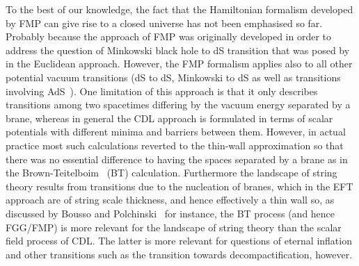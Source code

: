 \documentclass[a4paper,11pt]{article}
\numberwithin{equation}{section}
\begin{document}
To the best of our knowledge, the fact that the Hamiltonian formalism developed by FMP can give rise to a closed universe has not been emphasised so far. Probably because the approach of FMP was originally developed in order to address the question of Minkowski black hole to dS transition that was posed  by~\cite{Farhi:1989yr} in the Euclidean approach. However, the FMP formalism applies also to all other potential vacuum transitions (dS to dS, Minkowski to dS as well as transitions involving AdS~\cite{Freivogel:2005qh,Bachlechner:2016mtp, deAlwis:2019dkc,Fu:2019oyc,Mirbabayi:2020grb}). One limitation of this approach is that it only describes transitions among two spacetimes differing by the vacuum energy  separated by a brane, whereas in general the CDL approach is formulated in terms of scalar potentials with different minima and barriers between them. However, in actual practice most such calculations reverted to the thin-wall approximation so that there was no essential difference to having the spaces separated by a brane as in the Brown-Teitelboim~\cite{Brown:1988kg} (BT) calculation. Furthermore the landscape of string theory results from transitions due to the nucleation of branes, which in the EFT approach are of string scale thickness, and hence effectively a thin wall so, as discussed by Bousso and Polchinski~\cite{Bousso:2000xa} for instance, the BT process (and hence FGG/FMP)  is more relevant for the landscape of string theory than the scalar field process of CDL. The latter is more relevant for questions of eternal inflation and other transitions such as the transition towards decompactification, however.
\end{document}
